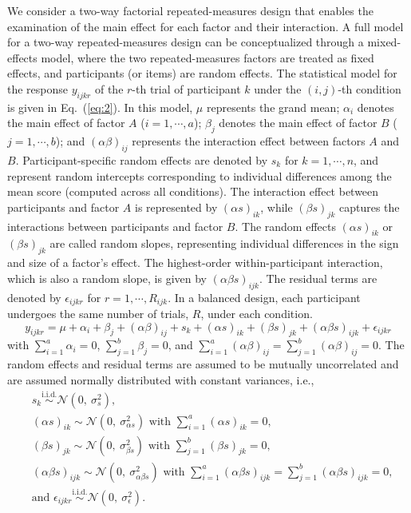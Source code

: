 \documentclass[preprint,12pt,authoryear]{elsarticle}
\begin{document}
We consider a two-way factorial repeated-measures design that enables the examination of the main effect for each factor and their interaction. A full model for a two-way repeated-measures design can be conceptualized through a mixed-effects model, where the two repeated-measures factors are treated as fixed effects, and participants (or items) are random effects. The statistical model for the response $y_{ijkr}$ of the $r$-th trial of participant $k$ under the $(i,j)$-th condition is given in Eq.~(\ref{eq:2}). In this model, $\mu$ represents the grand mean; $\alpha_i$ denotes the main effect of factor $A$ ($i=1,\dotsb,a$); $\beta_j$ denotes the main effect of factor $B$ ($j=1,\dotsb,b$); and $(\alpha\beta)_{ij}$ represents the interaction effect between factors $A$ and $B$. Participant-specific random effects are denoted by $s_k$ for $k=1,\dotsb,n$, and represent random intercepts corresponding to individual differences among the mean score (computed across all conditions). The interaction effect between participants and factor $A$ is represented by $(\alpha s)_{ik}$, while $(\beta s)_{jk}$ captures the interactions between participants and factor $B$. The random effects $(\alpha s)_{ik}$ or $(\beta s)_{jk}$ are called random slopes, representing individual differences in the sign and size of a factor's effect. The highest-order within-participant interaction, which is also a random slope, is given by $(\alpha\beta s)_{ijk}$. The residual terms are denoted by $\epsilon_{ijkr}$ for $r=1,\dotsb,R_{ijk}$. In a balanced design, each participant undergoes the same number of trials, $R$, under each condition.
\begin{equation} \label{eq:2}
	y_{ijkr}=\mu+\alpha_i+\beta_j+(\alpha\beta)_{ij}+s_k+(\alpha s)_{ik}+(\beta s)_{jk}+(\alpha\beta s)_{ijk}+\epsilon_{ijkr}
\end{equation}
with $\textstyle\sum_{i=1}^a \alpha_i=0$, $\textstyle\sum_{j=1}^b \beta_j=0$, and $\textstyle\sum_{i=1}^a (\alpha\beta)_{ij}=\sum_{j=1}^b (\alpha\beta)_{ij}=0$. The random effects and residual terms are assumed to be mutually uncorrelated and are assumed normally distributed with constant variances, i.e.,
\begin{align*}
	&s_k\overset{\mathrm{i.i.d.}}{\sim}\mathcal{N}(0,\ \!\sigma_s^2), \\
	&(\alpha s)_{ik}\sim\mathcal{N}(0,\ \!\sigma_{\alpha s}^2)\text{ with }\textstyle\sum_{i=1}^a(\alpha s)_{ik}=0, \\
	&(\beta s)_{jk}\sim\mathcal{N}(0,\ \!\sigma_{\beta s}^2)\text{ with }\textstyle\sum_{j=1}^b(\beta s)_{jk}=0, \\
	&(\alpha\beta s)_{ijk}\sim\mathcal{N}(0,\ \!\sigma_{\alpha\beta s}^2)\text{ with }\textstyle\sum_{i=1}^a (\alpha\beta s)_{ijk}=\sum_{j=1}^b (\alpha\beta s)_{ijk}=0, \\
	&\text{and }\epsilon_{ijkr}\overset{\mathrm{i.i.d.}}{\sim}\mathcal{N}(0,\ \!\sigma_{\epsilon}^2).
\end{align*}
\end{document}
